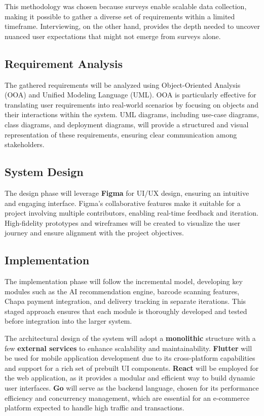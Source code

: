 \documentclass[12pt]{report}
\begin{document}
This methodology was chosen because surveys enable scalable data collection, making it
possible to gather a diverse set of requirements within a limited timeframe.\cite{c9} Interviewing,
on the other hand, provides the depth needed to uncover nuanced user expectations that might
not emerge from surveys alone.

\subsection{Requirement Analysis}

The gathered requirements will be analyzed using Object-Oriented Analysis (OOA) and
Unified Modeling Language (UML). OOA is particularly effective for translating user
requirements into real-world scenarios by focusing on objects and their interactions within
the system.\cite{c10} UML diagrams, including use-case diagrams, class diagrams, and deployment
diagrams, will provide a structured and visual representation of these requirements, ensuring
clear communication among stakeholders.

\subsection{System Design}

The design phase will leverage \textbf{Figma} for UI/UX design, ensuring an intuitive and engaging
interface. Figma’s collaborative features make it suitable for a project involving multiple
contributors, enabling real-time feedback and iteration.\cite{c11} High-fidelity prototypes and
wireframes will be created to visualize the user journey and ensure alignment with the project
objectives.

\subsection{Implementation}

The implementation phase will follow the incremental model, developing key modules such
as the AI recommendation engine, barcode scanning features, Chapa payment integration,
and delivery tracking in separate iterations. This staged approach ensures that each module is
thoroughly developed and tested before integration into the larger system.

The architectural design of the system will adopt a \textbf{monolithic} structure with a few \textbf{external services} to enhance
scalability and maintainability. \textbf{Flutter} will be used for mobile application development due
to its cross-platform capabilities and support for a rich set of prebuilt UI components. \textbf{React}
will be employed for the web application, as it provides a modular and efficient way to build
dynamic user interfaces. \textbf{Go} will serve as the backend language, chosen for its
performance efficiency and concurrency management, which are essential for an e-commerce
platform expected to handle high traffic and transactions.
\end{document}
